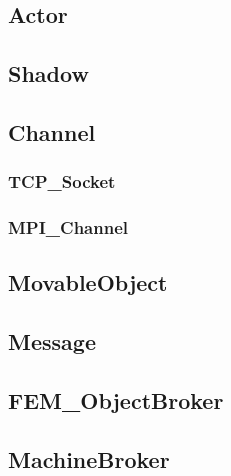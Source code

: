 \subsection{{\bf Actor}}


\pagebreak
\subsection{{\bf Shadow}}


\pagebreak
\subsection{{\bf Channel}}


\pagebreak
\subsubsection{TCP\_Socket}
% 

\pagebreak
\subsubsection{MPI\_Channel}
% 


\pagebreak
\subsection{{\bf MovableObject}}


\pagebreak
\subsection{Message}


\pagebreak
\subsection{FEM\_ObjectBroker}


\pagebreak
\subsection{{\bf MachineBroker}}







